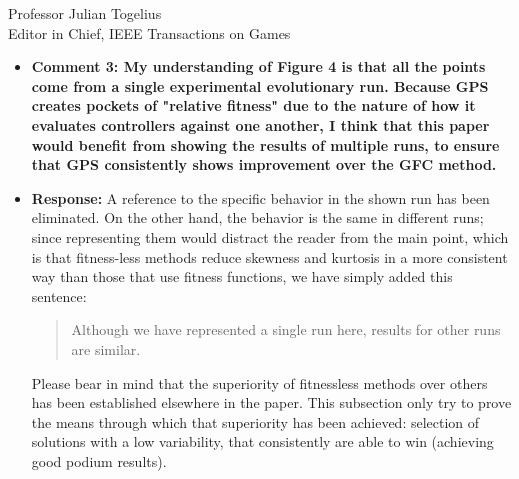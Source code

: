 \documentclass[10pt]{letter} %
\begin{document}
\begin{letter}{Professor Julian Togelius \\ Editor in Chief, IEEE Transactions on Games}
\begin{enumerate}
\begin{itemize}
		{\em Thus, in this paper we are testing the best approaches we have found all together in an algorithm, considering a kind of fitnessless selection, which we have called \textit{Grand Prix Selection} (GPS). Although this selection uses a score that could be assimilated to a fitness, it is actually an extension of a tournament selection policy since it creates tournaments of several individuals, and ``scores'' them according to how they fare in these races. This is not actually a fitness, since it is not intrinsic to the individual. It is indeed equivalent to, in a $n$-tournament selection that is repeated several times, giving a score of $n$ to the first, $n-1$ to the second, and then using this for selection. That score is, thus, not a fitness but actually a way of keeping track of the position of the individual in the different tournaments it has participated; since, in this context, we have no way of evaluating (i.e. assigning a fitness) to a controller but only a way to compare them, we call this approach {\em fitnessless}, as it was called, for instance, in [18].}


		\item {\bf  Comment 3: My understanding of Figure 4 is that all the points come from a single experimental evolutionary run. Because GPS creates pockets of "relative fitness" due to the nature of how it evaluates controllers against one another, I think that this paper would benefit from showing the results of multiple runs, to ensure that GPS consistently shows improvement over the GFC method.}
                \item {\bf Response:} A reference to the specific behavior in the shown run has been eliminated. On the other hand, the behavior is the same in different runs; since representing them would distract the reader from the main point, which is that fitness-less methods reduce skewness and kurtosis in a more consistent way than those that use fitness functions, we have simply added this sentence:
                  \begin{quote}
                    Although we have represented a single run here, results for other runs are similar.
                    \end{quote}
Please bear in mind that the superiority of fitnessless methods over others has been established elsewhere in the paper. This subsection only try to prove the means through which that superiority has been achieved: selection of solutions with a low variability, that consistently are able to win (achieving good podium results).
		

\end{itemize}
\end{enumerate}
\end{letter}
\end{document}
